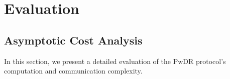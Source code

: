 \vspace{-3mm}
\section{Evaluation}\label{sec::eval}





\subsection{Asymptotic Cost Analysis} In this section, we present a detailed evaluation of the PwDR protocol’s computation and communication complexity. %

%



